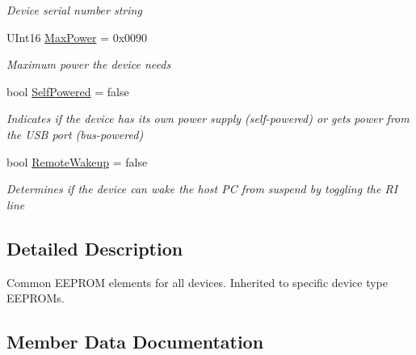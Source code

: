 \begin{DoxyCompactItemize}
\begin{DoxyCompactList}\small\item\em Device serial number string \end{DoxyCompactList}\item 
U\+Int16 \mbox{\hyperlink{class_f_t_d2_x_x___n_e_t_1_1_f_t_d_i_1_1_f_t___e_e_p_r_o_m___d_a_t_a_a733f1968fe4ad951ee0e23828f0eaf48}{Max\+Power}} = 0x0090
\begin{DoxyCompactList}\small\item\em Maximum power the device needs \end{DoxyCompactList}\item 
bool \mbox{\hyperlink{class_f_t_d2_x_x___n_e_t_1_1_f_t_d_i_1_1_f_t___e_e_p_r_o_m___d_a_t_a_a12dbf235e5ce752fa4699b966f56bff6}{Self\+Powered}} = false
\begin{DoxyCompactList}\small\item\em Indicates if the device has its own power supply (self-\/powered) or gets power from the U\+SB port (bus-\/powered) \end{DoxyCompactList}\item 
bool \mbox{\hyperlink{class_f_t_d2_x_x___n_e_t_1_1_f_t_d_i_1_1_f_t___e_e_p_r_o_m___d_a_t_a_a4763e5338d0ee6d2117a597e526f10be}{Remote\+Wakeup}} = false
\begin{DoxyCompactList}\small\item\em Determines if the device can wake the host PC from suspend by toggling the RI line \end{DoxyCompactList}\end{DoxyCompactItemize}


\subsection{Detailed Description}
Common E\+E\+P\+R\+OM elements for all devices. Inherited to specific device type E\+E\+P\+R\+O\+Ms. 



\subsection{Member Data Documentation}
\mbox{\label{class_f_t_d2_x_x___n_e_t_1_1_f_t_d_i_1_1_f_t___e_e_p_r_o_m___d_a_t_a_a2f722cb9e18cf1bf637db4de7477508f}} 
